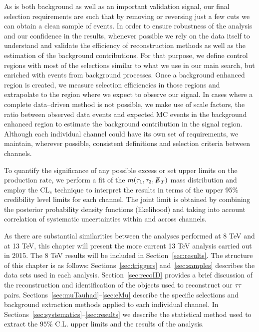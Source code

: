 As \zditau is both background as well as an important validation signal, our final selection requirements are such that by removing or
reversing just a few cuts we can obtain a clean sample of \zditau  events. In order to ensure robustness of the analysis and our
confidence in the results, whenever possible we rely on the data itself to understand and validate the efficiency of reconstruction
methods as well as the estimation of the background contributions. For that purpose, we define control regions with most of the
selections similar to what we use in our main search, but enriched with events from background processes. Once a background enhanced
region is created, we measure selection efficiencies in those regions and  extrapolate to the region  where we expect to observe our
signal. In cases where a complete data--driven method is not possible, we make use of scale factors, the ratio between observed data events
and expected MC events in the background enhanced region to estimate the background  contribution in the signal region. Although each
individual channel could have its own set of requirements, we maintain, wherever possible, consistent definitions and selection
criteria  between channels.

To quantify the significance of any possible excess or set upper limits on the production rate, we perform a fit of the $m(\tau_{1},\tau_{2},{\not\mathrel{E}}_T)$ mass 
distribution and employ the CL$_{s}$ technique to interpret the results in terms of the upper 95\% credibility level limits
for each channel. The joint limit is obtained by combining the posterior probability density functions (likelihood) and taking into
account correlation of systematic uncertainties within and across channels.

As there are substantial similarities between the analyses performed at 8 TeV and at 13 TeV, this chapter will present the more current 13 TeV analysis carried out in 2015. The 8 TeV results will be included in Section~\ref{sec:results}. The structure of this chapter is as follows: Sections~\ref{sec:triggers} and~\ref{sec:samples} describes the data sets used in each analysis.  Section~\ref{sec:recoID} provides a brief discussion of the reconstruction and identification of the objects used to reconstruct our  $\tau\tau$ 
pairs.
Sections~\ref{sec:muTauhad}--\ref{sec:eMu} describe the specific selections and background extraction methods applied  to each
individual channel. In Sections~\ref{sec:systematics}--\ref{sec:results} we describe the statistical method used to extract 
the $95\%$ C.L. upper limits and the results of the analysis. 
  
